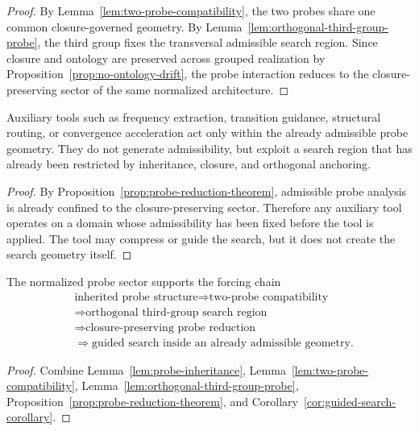 \begin{proof}
By Lemma~\ref{lem:two-probe-compatibility}, the two probes share one common
closure-governed geometry. By Lemma~\ref{lem:orthogonal-third-group-probe}, the
third group fixes the transversal admissible search region. Since closure and
ontology are preserved across grouped realization by
Proposition~\ref{prop:no-ontology-drift}, the probe interaction reduces to the
closure-preserving sector of the same normalized architecture.
\end{proof}

\begin{corollary}
\label{cor:guided-search-corollary}
Auxiliary tools such as frequency extraction, transition guidance, structural
routing, or convergence acceleration act only within the already admissible
probe geometry. They do not generate admissibility, but exploit a search region
that has already been restricted by inheritance, closure, and orthogonal
anchoring.
\end{corollary}

\begin{proof}
By Proposition~\ref{prop:probe-reduction-theorem}, admissible probe analysis is
already confined to the closure-preserving sector. Therefore any auxiliary tool
operates on a domain whose admissibility has been fixed before the tool is
applied. The tool may compress or guide the search, but it does not create the
search geometry itself.
\end{proof}

\begin{corollary}
\label{cor:first-probe-forcing-chain}
The normalized probe sector supports the forcing chain
\[
\begin{aligned}
&\text{inherited probe structure}
 \Longrightarrow \text{two-probe compatibility}\\
&\Longrightarrow \text{orthogonal third-group search region}\\
&\Longrightarrow \text{closure-preserving probe reduction}\\
&\Longrightarrow \text{guided search inside an already admissible geometry}.
\end{aligned}
\]
\end{corollary}

\begin{proof}
Combine Lemma~\ref{lem:probe-inheritance},
Lemma~\ref{lem:two-probe-compatibility},
Lemma~\ref{lem:orthogonal-third-group-probe},
Proposition~\ref{prop:probe-reduction-theorem}, and
Corollary~\ref{cor:guided-search-corollary}.
\end{proof}



